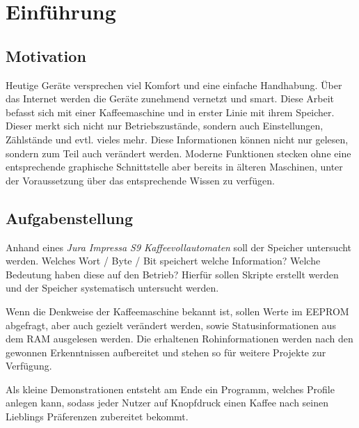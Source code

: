 \chapter{Einführung}

\section{Motivation}
Heutige Geräte versprechen viel Komfort und eine einfache Handhabung. Über das Internet werden die Geräte zunehmend vernetzt und smart.
Diese Arbeit befasst sich mit einer Kaffeemaschine und in erster Linie mit ihrem Speicher. Dieser merkt sich nicht nur Betriebszustände,
sondern auch Einstellungen, Zählstände und evtl. vieles mehr. Diese Informationen können nicht nur gelesen, sondern zum Teil auch verändert werden.
Moderne Funktionen stecken ohne eine entsprechende graphische Schnittstelle aber bereits in älteren Maschinen, unter der Voraussetzung über das entsprechende Wissen zu verfügen.

\section{Aufgabenstellung}
Anhand eines \textit{Jura Impressa S9 Kaffeevollautomaten} soll der Speicher untersucht werden.
Welches Wort / Byte / Bit speichert welche Information? Welche Bedeutung haben diese auf den Betrieb?
Hierfür sollen Skripte erstellt werden und der Speicher systematisch untersucht werden.

Wenn die Denkweise der Kaffeemaschine bekannt ist, sollen Werte im \ac{EEPROM} abgefragt, aber auch gezielt verändert werden, sowie Statusinformationen aus dem \ac{RAM} ausgelesen werden.
Die erhaltenen Rohinformationen werden nach den gewonnen Erkenntnissen aufbereitet und stehen so für weitere Projekte zur Verfügung.

Als kleine Demonstrationen entsteht am Ende ein Programm, welches Profile anlegen kann, sodass jeder Nutzer auf Knopfdruck einen Kaffee nach seinen Lieblings Präferenzen zubereitet bekommt.
